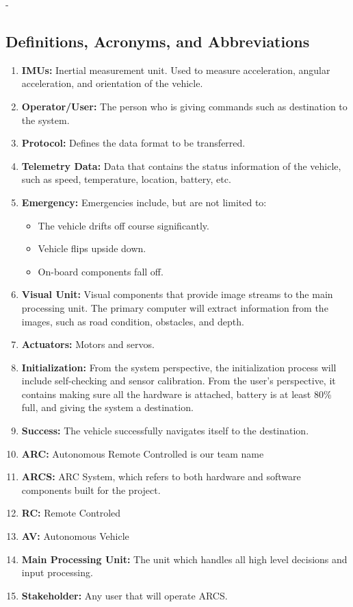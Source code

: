 -\documentclass[compsoc,draftclsnofoot,onecolumn,10pt]{IEEEtran}
\begin{document}
\subsection{Definitions, Acronyms, and Abbreviations} %
\begin{enumerate}
	\item \textbf{IMUs:} Inertial measurement unit. Used to measure acceleration, angular acceleration, and orientation of the vehicle.
	\item \textbf{Operator/User:} The person who is giving commands such as destination to the system.
	\item \textbf{Protocol:} Defines the data format to be transferred.
	\item \textbf{Telemetry Data:} Data that contains the status information of the vehicle, such as speed, temperature, location, battery, etc.
	\item \textbf{Emergency:} Emergencies include, but are not limited to: 
	\begin{itemize}
		\item The vehicle drifts off course significantly.
		\item Vehicle flips upside down.
		\item On-board components fall off.
	\end{itemize}
	\item \textbf{Visual Unit:} Visual components that provide image streams to the main processing unit. 
	The primary computer will extract information from the images, such as road condition, obstacles, and depth. 
	\item \textbf{Actuators:} Motors and servos.
	\item \textbf{Initialization:} From the system perspective, the initialization process will include self-checking and sensor calibration. 
	From the user's perspective, it contains making sure all the hardware is attached, battery is at least 80\% full, and giving the system a destination. 
	\item \textbf{Success:} The vehicle successfully navigates itself to the destination.
	\item \textbf{ARC:} Autonomous Remote Controlled is our team name
	\item \textbf{ARCS:} ARC System, which refers to both hardware and software components built for the project.
	\item \textbf{RC:} Remote Controled
	\item \textbf{AV:} Autonomous Vehicle
	\item \textbf{Main Processing Unit:} The unit which handles all high level decisions and input processing. 
	\item \textbf{Stakeholder:} Any user that will operate ARCS.
\end{enumerate}
\end{document}
